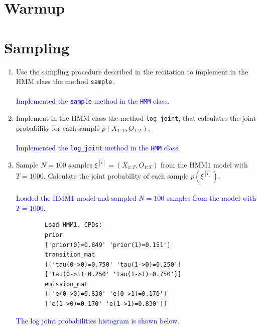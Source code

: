\documentclass[a4 paper]{article}
\begin{document}



\section{Warmup}


\section{Sampling}
\begin{enumerate}
    \item Use the sampling procedure described in the recitation to implement in the HMM class the method \texttt{sample}.
    \\ 
    \\
    \textcolor{blue}{
        Implemented the \texttt{sample} method in the \texttt{HMM} class.
    }

    \item Implement in the HMM class the method \texttt{log\_joint}, that calculates the joint probability for each sample \( p(X_{1:T}, O_{1:T}) \). 
    \\
    \\ \textcolor{blue}{
        Implemented the \texttt{log\_joint} method in the \texttt{HMM} class.
    }

    \item Sample \( N = 100 \) samples \( \xi^{[i]} = (X_{1:T}, O_{1:T}) \) from the HMM1 model with \( T = 1000 \). Calculate the joint probability of each sample \( p(\xi^{[i]}) \).
    \\
    \\ \textcolor{blue}{
        Loaded the HMM1 model and sampled \( N = 100 \) samples from the model with \( T = 1000 \).
    }
    \begin{verbatim}
        Load HMM1. CPDs:
        prior
        ['prior(0)=0.849' 'prior(1)=0.151']
        transition_mat
        [['tau(0->0)=0.750' 'tau(1->0)=0.250']
        ['tau(0->1)=0.250' 'tau(1->1)=0.750']]
        emission_mat
        [['e(0->0)=0.830' 'e(0->1)=0.170']
        ['e(1->0)=0.170' 'e(1->1)=0.830']]
    \end{verbatim}

    \textcolor{blue}{
        The log joint probabilities histogram is shown below.
    }    


\end{enumerate}
\end{document}

